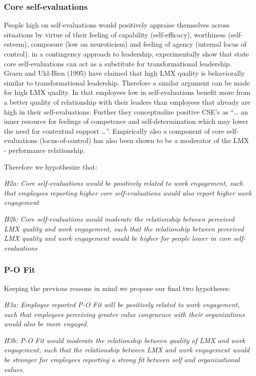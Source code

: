 \documentclass[12pt,a4paper,]{article}
\begin{document}
\subsubsection{Core self-evaluations}\label{core-self-evaluations}

People high on self-evaluations would positively appraise themselves
across situations by virtue of their feeling of capability
(self-efficacy), worthiness (self-esteem), composure (low on
neuroticism) and feeling of agency (internal locus of control). in a
contingency approach to leadership, experimentally show that state core
self-evaluations can act as a substitute for transformational
leadership. Graen and Uhl-Bien (1995) have claimed that high LMX quality
is behaviorally similar to transformational leadership. Therefore a
similar argument can be made for high LMX quality. In that employees low
in self-evaluations benefit more from a better quality of relationship
with their leaders than employees that already are high in their
self-evaluations. Further they conceptualize positive CSE's as
``\ldots{} an inner resource for feelings of competence and
self-determination which may lower the need for contextual support
\ldots{}''. Empirically also a component of core self-evaluations
(locus-of-control) has also been shown to be a moderator of the LMX -
performance relationship.

Therefore we hypothesize that:

\emph{H2a: Core self-evaluations would be positively related to work
engagement, such that employees reporting higher core self-evaluations
would also report higher work engagement}

\emph{H2b: Core self-evaluations would moderate the relationship between
perceived LMX quality and work engagement, such that the relationship
between perceived LMX quality and work engagement would be higher for
people lower in core self-evaluations}

\subsubsection{P-O Fit}\label{p-o-fit}

Keeping the previous reasons in mind we propose our final two
hypotheses:

\emph{H3a: Employee reported P-O Fit will be positively related to work
engagement, such that employees perceiving greater value congruence with
their organizations would also be more engaged.}

\emph{H3b: P-O Fit would moderate the relationship between quality of
LMX and work engagement, such that the relationship between LMX and work
engagement would be stronger for employees reporting a strong fit
between self and organizational values.}
\end{document}
